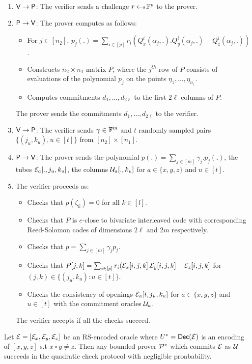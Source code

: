 \begin{enumerate}[{\rm 1.}]
\item $\mathsf{V}\rightarrow\mathsf{P}$: The verifier sends a challenge $r\hskip2.3pt{\gets\!\!\mbox{\tiny${\$}$\normalsize}}\,
\mathbb{F}^p$ to the prover.
\item $\mathsf{P}\rightarrow\mathsf{V}$: The prover computes as follows:
  \begin{itemize}
  \item For $j\in [n_2]$, $p_j(.)=\sum_{i\in [p]}
r_i(Q^i_x(\alpha_j,.).Q^i_y(\alpha_j,.)-Q^i_z(\alpha_j,.))$.
  \item Constructs $n_2\times n_1$ matrix $P$, where the $j^{th}$ row of $P$
consists of evaluations of the polynomial $p_j$ on the points
$\eta_1,\ldots,\eta_{n_1}$.
  \item Computes commitments $d_1,\ldots,d_{2\ell}$ to the first $2\ell$
columns of $P$.
  \end{itemize}
The prover sends the commitments $d_1,\ldots,d_{2\ell}$ to the verifier.

\item $\mathsf{V}\rightarrow\mathsf{P}$: The verifier sends $\gamma\in \mathbb{F}^m$ and
$t$ randomly sampled pairs $\{(j_u,k_u),u\in [t]\}$ from $[n_2]\times [n_1]$. 

\item $\mathsf{P}\rightarrow\mathsf{V}$: The prover sends the polynomial
$p(.)=\sum_{j\in [m]}\gamma_j.p_j(.)$, the tubes $\mathcal{E}_a[.,j_u,k_u]$,
 the columns $\mathcal{U}_a[.,k_u]$ for $a\in\{x,y,z\}$ and $u\in [t]$.

\item The verifier proceeds as:
  \begin{itemize}
  \item Checks that $p(\zeta_k)=0$ for all $k\in [l]$.
  \item Checks that $P$ is $e$-close to bivariate interleaved code with
corresponding Reed-Solomon codes of dimensions $2\ell$ and $2m$ respectively.
  \item Checks that $p=\sum_{j\in [m]}\gamma_jp_j$.
  \item Checks that $P[j,k]=\sum_{i\in
[p]}r_i(\mathcal{E}_x[i,j,k].\mathcal{E}_y[i,j,k]-\mathcal{E}_z[i,j,k]$ for $(j,k)\in
\{(j_u,k_u):u\in [t]\}$.
  \item Checks the consistency of openings $\mathcal{E}_a[i,j_u,k_u]$ for $a\in
\{x,y,z\}$ and $u\in [t]$ with the commitment oracles $\mathcal{U}_a$.
  \end{itemize}
The verifier accepts if all the checks succeed.

\end{enumerate}


\begin{lemma}\label{lem:quadhecksound}
Let $\mathcal{E} = [\mathcal{E}_x,\mathcal{E}_y,\mathcal{E}_z]$ be an RS-encoded oracle where $U^\ast=\mathsf{Dec}(\mathcal{E})$ is
an encoding of $[x,y,z]$ s.t $x\circ y\neq z$. Then any bounded prover $\mathcal{P}^\ast$ which
commits $\mathcal{E}$ as $\mathcal{U}$ succeeds in the quadratic check protocol with
negligible proabability.
\end{lemma}


